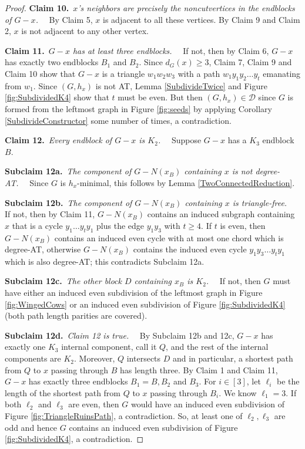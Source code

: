 \documentclass[12pt]{article}
\theoremstyle{plain}
\theoremstyle{definition}
\theoremstyle{remark}
\newcommand{\fancy}[1]{\mathcal{#1}}
\newcommand{\D}{\fancy{D}}
\newcommand{\irange}[1]{\left[#1\right]}
\def\D{\fancy{D}}
\newcommand{\claim}[2]{{\bf Claim #1.}~{\it #2}~~}
\newcommand{\subclaim}[2]{{\bf Subclaim #1.}~{\it #2}~~}
\begin{document}
\begin{proof}
	 \claim{10}{$x$'s neighbors are precisely the noncutvertices in the endblocks of $G-x$.}
	 By Claim 5, $x$ is adjacent to all these vertices.  By Claim 9 and Claim 2, $x$ is not adjacent to any other vertex.
	 
	 \claim{11}{$G-x$ has at least three endblocks.}
	 If not, then by Claim 6, $G-x$ has exactly two endblocks $B_1$ and $B_2$.  Since $d_G(x) \ge 3$, Claim 7, Claim 9 and Claim 10 show that $G-x$ is a triangle $w_1w_2w_3$ with a path $w_1y_1y_2\ldots y_t$ emanating from $w_1$.  Since $(G,h_x)$ is not AT, Lemma \ref{SubdivideTwice} and Figure \ref{fig:SubdividedK4} show that $t$ must be even.  But then $(G, h_x) \in \D$ since $G$ is formed from the leftmost graph in Figure \ref{fig:seeds} by applying Corollary \ref{SubdivideConstructor} some number of times, a contradiction.

	 \claim{12}{Every endblock of $G-x$ is $K_2$.}
	 Suppose $G-x$ has a $K_3$ endblock $B$.  
	 
	 \subclaim{12a}{The component of $G-N(x_B)$ containing $x$ is not degree-AT.}
	 Since $G$ is $h_x$-minimal, this follows by Lemma \ref{TwoConnectedReduction}.
	 
	 \subclaim{12b}{The component of $G-N(x_B)$ containing $x$ is triangle-free.}
	 If not, then by Claim 11, $G-N(x_B)$ contains an induced subgraph containing $x$ that is a cycle $y_1\ldots y_ty_1$ plus the edge $y_1y_3$ with $t \ge 4$.  If $t$ is even, then $G-N(x_B)$ contains an induced even cycle with at most one chord which is degree-AT, otherwise $G-N(x_B)$ contains the induced even cycle $y_1y_3\ldots y_ty_1$ which is also degree-AT; this contradicts Subclaim 12a.
	 
	 \subclaim{12c}{The other block $D$ containing $x_B$ is $K_2$.}
	 If not, then $G$ must have either an induced even subdivision of the leftmost graph in Figure \ref{fig:WingedCows} or an induced even subdivision of Figure \ref{fig:SubdividedK4} (both path length parities are covered).
	 
	 \subclaim{12d}{Claim 12 is true.}
	 By Subclaim 12b and 12c, $G-x$ has exactly one $K_3$ internal component, call it $Q$, and the rest of the internal components are $K_2$.  Moreover, $Q$ intersects $D$ and in particular, a shortest path from $Q$ to $x$ passing through $B$ has length three. By Claim 1 and Claim 11, $G-x$ has exactly three endblocks $B_1 = B, B_2$ and $B_3$.  For $i \in \irange{3}$, let $\ell_i$ be the length of the shortest path from $Q$ to $x$ passing through $B_i$.  We know $\ell_1 = 3$.  If both $\ell_2$ and $\ell_3$ are  even, then $G$ would have an induced even subdivision of Figure \ref{fig:TriangleRuinsPath}, a contradiction.   So, at least one of $\ell_2, \ell_3$ are odd and hence $G$ contains an induced even subdivision of Figure \ref{fig:SubdividedK4}, a contradiction. 
	 

\end{proof}
\end{document}
